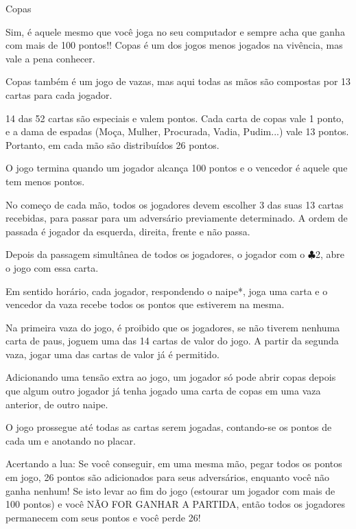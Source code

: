 \begin{subsecao}{Copas}

Sim, é aquele mesmo que você joga no seu computador e sempre acha que ganha com
mais de 100 pontos!! Copas é um dos jogos menos jogados na vivência, mas vale a
pena conhecer.

Copas também é um jogo de vazas, mas aqui todas as mãos são compostas por 13
cartas para cada jogador.

14 das 52 cartas são especiais e valem pontos. Cada carta de copas vale 1
ponto, e a dama de espadas (Moça, Mulher, Procurada, Vadia, Pudim...) vale 13
pontos. Portanto, em cada mão são distribuídos 26 pontos.

O jogo termina quando um jogador alcança 100 pontos e o vencedor é aquele que
tem menos pontos.

No começo de cada mão, todos os jogadores devem escolher 3 das suas 13 cartas
recebidas, para passar para um adversário previamente determinado. A ordem de
passada é jogador da esquerda, direita, frente e não passa.

Depois da passagem simultânea de todos os jogadores, o jogador com
o $\clubsuit$2, abre o jogo com essa carta.

Em sentido horário, cada jogador, respondendo o naipe*, joga uma carta e o
vencedor da vaza recebe todos os pontos que estiverem na mesma.

Na primeira vaza do jogo, é proibido que os jogadores, se não tiverem nenhuma
carta de paus, joguem uma das 14 cartas de valor do jogo. A partir da segunda
vaza, jogar uma das cartas de valor já é permitido.

Adicionando uma tensão extra ao jogo, um jogador só pode abrir copas depois que
algum outro jogador já tenha jogado uma carta de copas em uma vaza anterior, de
outro naipe.

O jogo prossegue até todas as cartas serem jogadas, contando-se os pontos de
cada um e anotando no placar.

Acertando a lua: Se você conseguir, em uma mesma mão, pegar todos os pontos em
jogo, 26 pontos são adicionados para seus adversários, enquanto você não ganha
nenhum! Se isto levar ao fim do jogo (estourar um jogador com mais de 100
pontos) e você NÃO FOR GANHAR A PARTIDA, então todos os jogadores permanecem
com seus pontos e você perde 26!

\end{subsecao}
